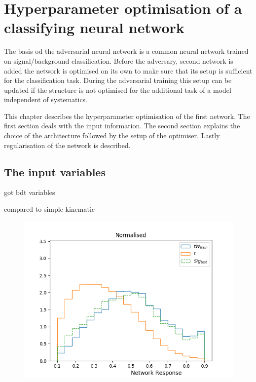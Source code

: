 \chapter{Hyperparameter optimisation of a classifying neural network}
\label{sec:simpleNN}

The basis od the adversarial neural network is a common neural network trained on signal/background classification.
Before the adversary, second network is added the network is optimised on its own to make sure that its setup is sufficient for the classification task.
During the adversarial training this setup can be updated if the structure is not optimised for the additional task of a model independent of systematics.

This chapter describes the hyperparameter optimisation of the first network. The first section deals with the input information.
The second section explains the choice of the architecture followed by the setup of the optimiser.
Lastly regularisation of the network is described.

\section{The input variables}

got bdt variables

compared to simple kinematic

\begin{figure}
	\centering
	\includegraphics[width=\figwidth]{figures_simpleNN/test_simple.png}
\end{figure}




